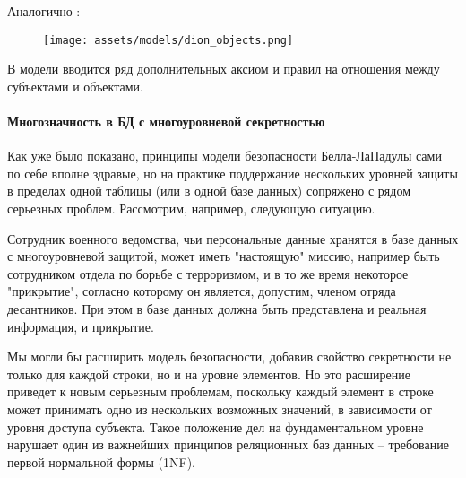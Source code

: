 Аналогично \autocite{Jalili2}:
\begin{figure}[H]
    \centering
    \texttt{[image: assets/models/dion\_objects.png]}
\end{figure}

В модели вводится ряд дополнительных аксиом и правил на отношения между субъектами и объектами.

\paragraph{Многозначность в БД с многоуровневой секретностью}

Как уже было показано,  принципы модели безопасности Белла-ЛаПадулы сами по себе вполне здравые,  но на практике поддержание нескольких уровней защиты в пределах одной таблицы (или в одной базе данных) сопряжено с рядом серьезных проблем.  Рассмотрим, например, следующую ситуацию.

Сотрудник военного ведомства, чьи персональные данные хранятся в базе данных с многоуровневой защитой, может иметь "настоящую" миссию, например быть сотрудником отдела по борьбе с терроризмом, и в то же время некоторое "прикрытие", согласно которому он является, допустим, членом отряда десантников. При этом в базе данных должна быть представлена и реальная информация, и прикрытие. 

Мы могли бы расширить модель безопасности, добавив свойство секретности не только для каждой строки, но и на уровне элементов. Но это расширение приведет к новым серьезным проблемам, поскольку каждый элемент в строке может принимать одно из нескольких возможных значений, в зависимости от уровня доступа субъекта. Такое положение дел на фундаментальном уровне нарушает один из важнейших принципов реляционных баз данных – требование первой нормальной формы (1NF)\footnotemark. 


